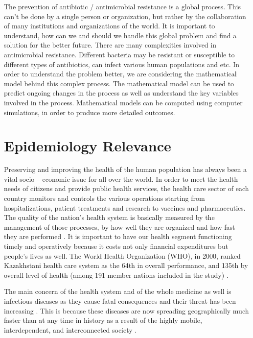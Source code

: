 The prevention of antibiotic / antimicrobial resistance is a global process. This can't be done by a single person or organization, but rather by the collaboration of many institutions and organizations of the world. It is important to understand, how can we and should we handle this global problem and find a solution for the better future. There are many complexities involved in antimicrobial resistance. Different bacteria may be resistant or susceptible to different types of antibiotics, can infect various human populations and etc. In order to understand the problem better, we are considering the mathematical model behind this complex process. The mathematical model can be used to predict ongoing changes in the process as well as understand the key variables involved in the process. Mathematical models can be computed using computer simulations, in order to produce more detailed outcomes.

\section{Epidemiology Relevance}

Preserving and improving the health of the human population has always been a vital socio – economic issue for all over the world. In order to meet the health needs of citizens and provide public health services, the health care sector of each country monitors and controls the various operations starting from hospitalizations, patient treatments and research to vaccines and pharmaceutics. The quality of the nation’s health system is basically measured by the management of those processes, by how well they are organized and how fast they are performed \cite{per1}. It is important to have our health segment functioning timely and operatively because it costs not only financial expenditures but people’s lives as well. The World Health Organization (WHO), in 2000, ranked Kazakhstani health care system as the 64th in overall performance, and 135th by overall level of health (among 191 member nations included in the study) \cite{per1}.

The main concern of the health system and of the whole medicine as well is infectious diseases as they cause fatal consequences and their threat has been increasing \cite{per1}. This is because these diseases are now spreading geographically much faster than at any time in history as a result of the highly mobile, interdependent, and interconnected society \cite{per2}.


